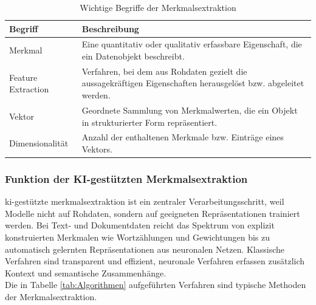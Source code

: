 \begin{table}[h]
\centering
\caption{Wichtige Begriffe der Merkmalsextraktion \cite{sklearn_feature_extraction,google_ml_glossary_embedding}}
\label{tab:Merkmalsextraktion}
\begin{tabular}{p{4cm} p{10cm}}
\textbf{Begriff} & \textbf{Beschreibung} \\ \hline

Merkmal &
Eine quantitativ oder qualitativ erfassbare Eigenschaft, die ein Datenobjekt beschreibt. \\\hline

Feature Extraction &
Verfahren, bei dem aus Rohdaten gezielt die aussagekräftigen Eigenschaften herausgelöst bzw. abgeleitet werden.  \\\hline

Vektor &
Geordnete Sammlung von Merkmalwerten, die ein Objekt in strukturierter Form repräsentiert. \\ \hline

Dimensionalität &
Anzahl der enthaltenen Merkmale bzw. Einträge eines Vektors. \\ \hline

\end{tabular}
\end{table}

\subsubsection{Funktion der KI-gestützten Merkmalsextraktion}

\gls{ki}-gestützte \gls{merkmalsextraktion} ist ein zentraler Verarbeitungsschritt, weil Modelle nicht auf Rohdaten, sondern auf geeigneten Repräsentationen trainiert werden. Bei Text- und Dokumentdaten reicht das Spektrum von explizit konstruierten Merkmalen wie Wortzählungen und Gewichtungen bis zu automatisch gelernten Repräsentationen aus neuronalen Netzen. Klassische Verfahren sind transparent und effizient, neuronale Verfahren erfassen zusätzlich Kontext und semantische Zusammenhänge. \cite{sklearn_feature_extraction,manning2008irbook,bert_2019} \\

Die in Tabelle \ref{tab:Algorithmen} aufgeführten Verfahren sind typische Methoden der Merkmalsextraktion.

